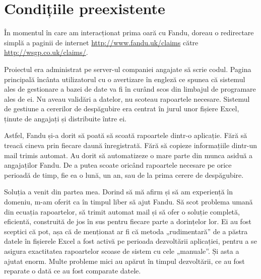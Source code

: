 \section*{Condițiile preexistente}
	În momentul în care am interacționat prima oară cu Fandu, doreau o redirectare simplă a paginii de internet
	\url{http://www.fandu.uk/claims}\cite{fandu_uk} către \\
	\url{http://wsgp.co.uk/claims/}\cite{wsgp_claims}.

	Proiectul era administrat pe server-ul companiei angajate să scrie codul. Pagina principală încânta utilizatorul cu o avertizare în engleză ce spunea că sistemul ales de gestionare a bazei de date va fi în curând scos din limbajul de programare ales de ei. Nu aveau validări a datelor, nu scoteau rapoartele necesare. Sistemul de gestiune a cererilor de despăgubire era centrat în jurul unor fișiere Excel, ținute de angajați și distribuite între ei.

	Astfel, Fandu și-a dorit să poată să scoată rapoartele dintr-o aplicație. Fără să treacă cineva prin fiecare daună înregistrată. Fără să copieze informațiile dintr-un mail trimis automat. Au dorit să automatizeze o mare parte din munca asiduă a angajaților Fandu. De a putea scoate oricând rapoartele necesare pe orice perioadă de timp, fie ea o lună, un an, sau de la prima cerere de despăgubire.

	Soluția a venit din partea mea. Dorind să mă afirm și să am experiență în domeniu, m-am oferit ca în timpul liber să ajut Fandu. Să scot problema umană din ecuația rapoartelor, să trimit automat mail și să ofer o soluție completă, eficientă, construită de jos în sus pentru fiecare parte a dorințelor lor. Ei au fost sceptici că pot, așa că de menționat ar fi că metoda „rudimentară” de a păstra datele în fișierele Excel a fost activă pe perioada dezvoltării aplicației, pentru a se asigura exactitatea rapoartelor scoase de sistem cu cele „manuale”. Și asta a ajutat enorm. Multe probleme mici au apărut în timpul dezvoltării, ce au fost reparate o dată ce au fost comparate datele.
